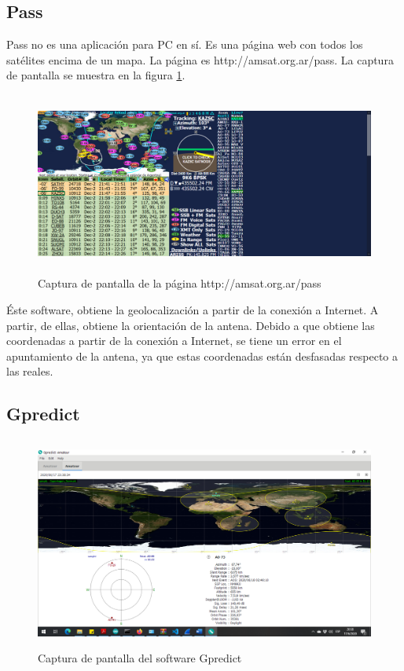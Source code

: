 \subsection{Pass}
Pass no es una aplicación para PC en sí. Es una página web con todos los satélites encima de un mapa. La página es http://amsat.org.ar/pass. La captura de pantalla se muestra en la figura \ref{fig:iu_pass}.
\begin{figure}[ht]
	\centering
	\includegraphics[width=\linewidth, height= 6cm]{pass}
	\caption{Captura de pantalla de la página http://amsat.org.ar/pass }
	\label{fig:iu_pass}
\end{figure}

Éste software, obtiene la geolocalización a partir de la conexión a Internet. A partir, de ellas, obtiene la orientación de la antena. Debido a que obtiene las coordenadas a partir de la conexión a Internet, se tiene un error en el apuntamiento de la antena, ya que estas coordenadas están desfasadas respecto a las reales.    

\subsection{Gpredict}
\begin{figure}[h]
	\centering
	\includegraphics[width=\linewidth,height=7cm]{gpredict}
	\caption{Captura de pantalla del software Gpredict}
	\label{fig:iu_gpredict}
\end{figure}

